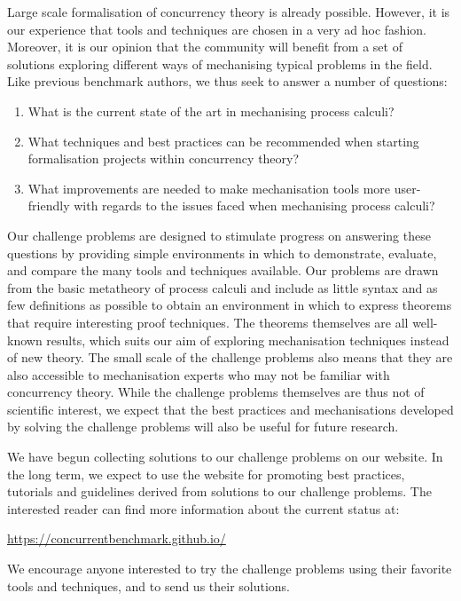 \documentclass[runningheads]{llncs}
\begin{document}
Large scale formalisation of concurrency theory is already possible.
However, it is our experience that tools and techniques are chosen in
a very ad hoc fashion. Moreover, it is our opinion that the community
will benefit from a set of solutions exploring different ways of
mechanising typical problems in the field. Like previous benchmark
authors, we thus seek to answer a number of questions:
\begin{enumerate}
\item What is the current state of the art in mechanising process calculi?
\item What techniques and best practices can be recommended when starting formalisation projects within concurrency theory?
\item What improvements are needed to make mechanisation tools more user-friendly with regards to the issues faced when mechanising process calculi?
\end{enumerate}

Our challenge problems are designed to stimulate progress on answering these questions by providing simple environments in which to demonstrate, evaluate, and compare the many tools and techniques available.
Our problems are drawn from the basic metatheory of process calculi and include as little syntax and as few definitions as possible to obtain an environment in which to express theorems that require interesting proof techniques.
The theorems themselves are all well-known results, which suits our aim of exploring mechanisation techniques instead of new theory.
The small scale of the challenge problems also means that they are also accessible to mechanisation experts who may not be familiar with concurrency theory.
While the challenge problems themselves are thus not of scientific interest, we expect that the best practices and mechanisations developed by solving the challenge problems will also be useful for future research.

We have begun collecting solutions to our challenge problems on our website.
In the long term, we expect to use the website for promoting best practices, tutorials and guidelines derived from solutions to our challenge problems.
The interested reader can find more information about the current status at:
\begin{center}
  \url{https://concurrentbenchmark.github.io/}
\end{center}
We encourage anyone interested to try the challenge problems using their favorite tools and techniques, and to send us their solutions.
\end{document}
